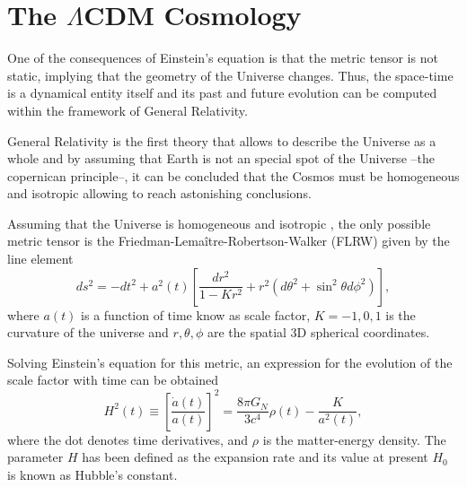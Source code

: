 \section{The $\Lambda$CDM Cosmology}
One of the consequences of Einstein's equation is that the metric tensor is not static, implying that the geometry of the Universe changes. Thus, the space-time is a dynamical entity itself and its past and future evolution can be computed within the framework of General Relativity.
\newline

General Relativity is the first theory that allows to describe the Universe as a whole and by assuming that Earth is not an special spot of the Universe --the copernican principle--, it can be concluded that the Cosmos must be homogeneous and isotropic allowing to reach astonishing conclusions.
\newline

Assuming that the Universe is homogeneous and isotropic \citep{2014MNRAS.440...10A,2015MNRAS.449..670A}, the only possible metric tensor is the Friedman-Lema\^itre-Robertson-Walker (FLRW) given by the line element \cite{1927ASSB...47...49L}
\begin{equation}
ds^2 = -dt^2+a^2(t)\left[\frac{dr^2}{1-Kr^2}+r^2(d\theta^2+\sin^2\theta d\phi^2)\right],
\end{equation}
where $a(t)$ is a function of time know as scale factor, $K=-1,0,1$ is the curvature of the universe and $r,\theta,\phi$ are the spatial 3D spherical coordinates.
\newline

Solving Einstein's equation for this metric, an expression for the evolution of the scale factor with time can be obtained
\begin{equation}
H^2(t)\equiv \left[\frac{\dot a(t)}{a(t)}\right]^2 = \frac{8\pi G_N}{3c^4}\rho(t) -\frac{K}{a^2(t)},
\end{equation}
where the dot denotes time derivatives, and $\rho$ is the matter-energy density. The parameter $H$ has been defined as the expansion rate and its value at present $H_0$ is known as Hubble's constant.
\newline

